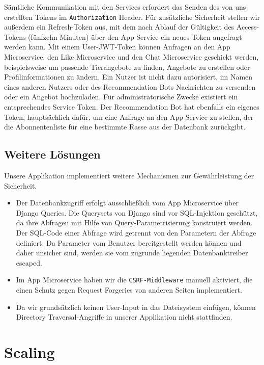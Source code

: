 \documentclass{article}
\begin{document}
Sämtliche Kommunikation mit den Services erfordert das Senden des von uns erstellten Tokens im \verb|Authorization| Header.
Für zusätzliche Sicherheit stellen wir außerdem ein Refresh-Token aus, mit dem nach Ablauf der Gültigkeit des Access-Tokens (fünfzehn Minuten) über den App Service ein neues Token angefragt werden kann.
Mit einem User-JWT-Token können Anfragen an den App Microservice, den Like Microservice und den Chat Microservice geschickt werden, beispielsweise um passende Tierangebote zu finden, Angebote zu erstellen oder Profilinformationen zu ändern. Ein Nutzer ist nicht dazu autorisiert, im Namen eines anderen Nutzers oder des Recommendation Bots Nachrichten zu versenden oder ein Angebot hochzuladen. Für administratorische Zwecke existiert ein entsprechendes Service Token. Der Recommendation Bot hat ebenfalls ein eigenes Token, hauptsächlich dafür, um eine Anfrage an den App Service zu stellen, der die Abonnentenliste für eine bestimmte Rasse aus der Datenbank zurückgibt.


\subsection{Weitere Lösungen}
Unsere Applikation implementiert weitere Mechanismen zur Gewährleistung der Sicherheit.

\begin{itemize}
    \item Der Datenbankzugriff erfolgt ausschließlich vom App Microservice über Django Queries. Die Querysets von Django sind vor SQL-Injektion geschützt, da ihre Abfragen mit Hilfe von Query-Parametrisierung konstruiert werden. Der SQL-Code einer Abfrage wird getrennt von den Parametern der Abfrage definiert. Da Parameter vom Benutzer bereitgestellt werden können und daher unsicher sind, werden sie vom zugrunde liegenden Datenbanktreiber escaped.~\cite{django-security}
    \item Im App Microservice haben wir die \verb|CSRF-Middleware| manuell aktiviert, die einen Schutz gegen Request Forgeries von anderen Seiten implementiert.
    \item Da wir grundsätzlich keinen User-Input in das Dateisystem einfügen, können Directory Traversal-Angriffe in unserer Applikation nicht stattfinden.
\end{itemize}


\section{Scaling} %
\end{document}

